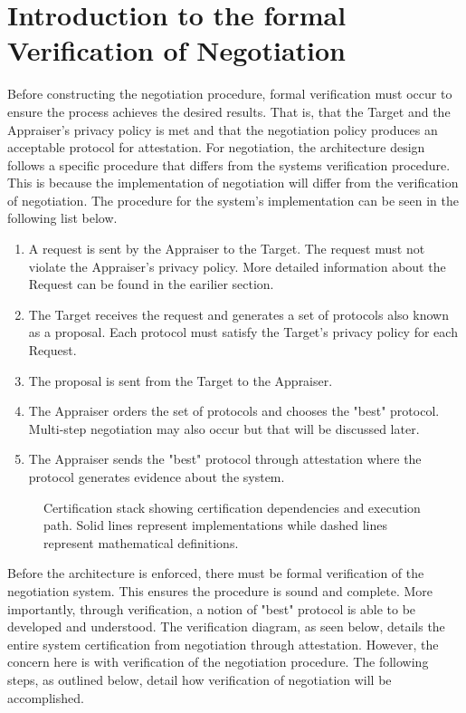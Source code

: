 \documentclass[10pt]{report}
\begin{document}
\section {Introduction to the formal Verification of Negotiation}

Before constructing the negotiation procedure, formal verification must occur to ensure the process achieves the desired results. That is, that the Target and the Appraiser's privacy policy is met and that the negotiation policy produces an acceptable protocol for attestation. For negotiation, the architecture design follows a specific procedure that differs from the systems verification procedure. This is because the implementation of negotiation will differ from the verification of negotiation. The procedure for the system's implementation can be seen in the following list below. 

\begin{enumerate}
\item A request is sent by the Appraiser to the Target. The request must not violate the Appraiser's privacy policy. More detailed information about the Request can be found in the earilier section. 
\item The Target receives the request and generates a set of protocols also known as a proposal. Each protocol must satisfy the Target's privacy policy for each Request. 
\item The proposal is sent from the Target to the Appraiser.  
\item The Appraiser orders the set of protocols and chooses the "best" protocol. Multi-step negotiation may also occur but that will be discussed later. 
\item The Appraiser sends the "best" protocol through attestation where the protocol generates evidence about the system. 
\end{enumerate}

\begin{figure}[hbtp]
  \centering
  
  \caption[Certification Figure]{Certification stack showing
    certification dependencies and execution path. Solid lines
    represent implementations while dashed lines represent
    mathematical definitions.}
  \label{fig:certification-fig}
\end{figure}

Before the architecture is enforced, there must be formal verification of the negotiation system. This ensures the procedure is sound and complete. More importantly, through verification, a notion of "best" protocol is able to be developed and understood. The verification diagram, as seen below, details the entire system certification from negotiation through attestation. However, the concern here is with verification of the negotiation procedure. The following steps, as outlined below, detail how verification of negotiation will be accomplished.  
\end{document}
